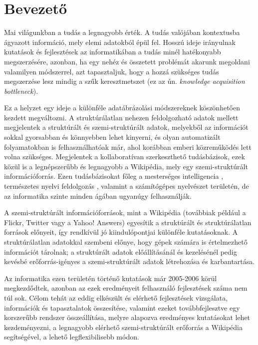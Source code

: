 
\chapter*{Bevezető}
\label{cha:intro}

Mai világunkban a tudás a legnagyobb érték. A tudás valójában kontextusba ágyazott információ, mely elemi adatokból épül fel. Hosszú ideje irányulnak kutatások és fejlesztések az informatikában a tudás minél hatékonyabb megszerzésére, azonban, ha egy nehéz és összetett problémát akarunk megoldani valamilyen módszerrel, azt tapasztaljuk, hogy a hozzá szükséges tudás megszerzése lesz mindig a szűk keresztmetszet (ez az ún. \textit{knowledge acquisition bottleneck}).

Ez a helyzet egy ideje a különféle adatábrázolási módszereknek köszönhetően kezdett megváltozni. A struktúrálatlan nehezen feldolgozható adatok mellett megjelentek a struktúrált és szemi-struktúrált adatok, melyekből az információt sokkal gyorsabban és könnyebben lehet kinyerni, és olyan automatizált folyamatokban is felhasználhatóak már, ahol korábban emberi közreműködés lett volna szükséges. Megjelentek a kollaboratívan szerkeszthető tudásbázisok, ezek közül is a legnépszerűbb és legnagyobb a Wikipédia, mely egy szemi-struktúrált információforrás. Ezen tudásbázisokat főleg a mesterséges intelligencia \cite{aijournal}, természetes nyelvi feldolgozás \cite{sciborg}, valamint a számítógépes nyelvészet területén, de az informatika szinte minden ágában ugyanúgy felhasználják.

A szemi-struktúrált információforrások, mint a Wikipédia (továbbiak például a Flickr, Twitter vagy a Yahoo! Answers) egyesítik a struktúrált és struktúrálatlan források előnyeit, így rendkívül jó kiindulópontjai különféle kutatásoknak. A struktúrálatlan adatokkal szembeni előnye, hogy gépek számára is értelmezhető információt tárolnak; a struktúrált adatok előállításánál és kezelésénél pedig kevésbé erőforrás-igényes a szemi-struktúrált adatok létrehozása és karbantartása.

Az informatika ezen területén történő kutatások már 2005-2006 körül megkezdődtek, azonban az ezek eredményeit felhasználó fejlesztések száma nem túl sok. Célom tehát az eddig elkészült és elérhető fejlesztések vizsgálata, információk és tapasztalatok összesítése, valamint ezeket továbbfejlesztve egy korszerűbb rendszer összeállítása, melyre alapozva eredményes kutatásokat lehet kezdeményezni, a legnagyobb elérhető szemi-struktúrált erőforrás a Wikipédia segítségével, a lehető legflexibilisebb módon.


